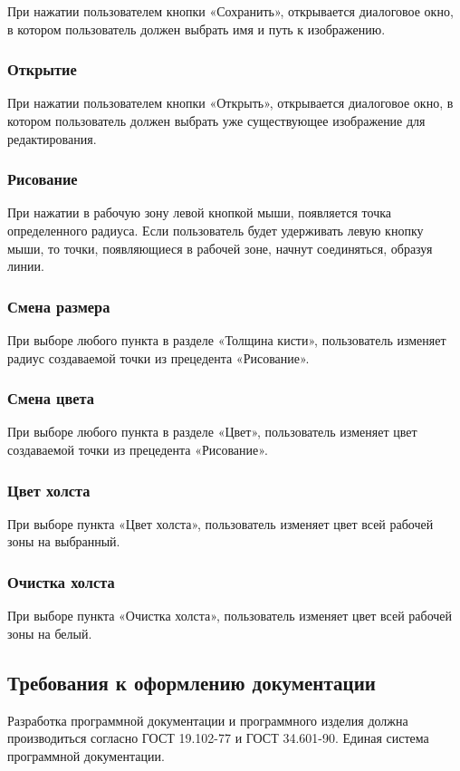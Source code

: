 При нажатии пользователем кнопки «Сохранить», открывается диалоговое окно, в котором пользователь должен выбрать имя и путь к изображению.

\subsubsection{Открытие}

При нажатии пользователем кнопки «Открыть», открывается диалоговое окно, в котором пользователь должен выбрать уже существующее изображение для редактирования.

\subsubsection{Рисование}

При нажатии в рабочую зону левой кнопкой мыши, появляется точка определенного радиуса. Если пользователь будет удерживать левую кнопку мыши, то точки, появляющиеся в рабочей зоне, начнут соединяться, образуя линии.

\subsubsection{Смена размера}

При выборе любого пункта в разделе «Толщина кисти», пользователь изменяет радиус создаваемой точки из прецедента «Рисование».

\subsubsection{Смена цвета}

При выборе любого пункта в разделе «Цвет», пользователь изменяет цвет создаваемой точки из прецедента «Рисование».

\subsubsection{Цвет холста}

При выборе пункта «Цвет холста», пользователь изменяет цвет всей рабочей зоны на выбранный.

\subsubsection{Очистка холста}

При выборе пункта «Очистка холста», пользователь изменяет цвет всей рабочей зоны на белый.

\subsection{Требования к оформлению документации}

Разработка программной документации и программного изделия должна производиться согласно ГОСТ 19.102-77 и ГОСТ 34.601-90. Единая система программной документации.
